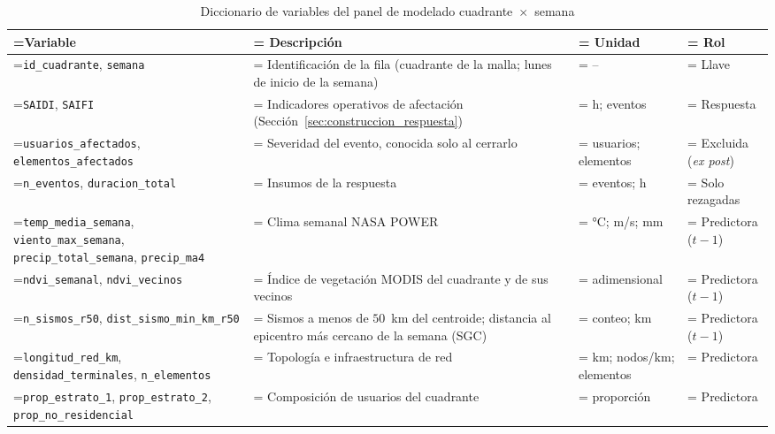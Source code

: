 \begin{table}[!htbp]
\centering\footnotesize
\caption{Diccionario de variables del panel de modelado cuadrante~$\times$~semana}
\label{tab:catalogo_variables}
\begin{tabularx}{\linewidth}{@{} >{\raggedright\arraybackslash\hsize=1.100\hsize\linewidth=\hsize}X >{\raggedright\arraybackslash\hsize=1.450\hsize\linewidth=\hsize}X >{\raggedright\arraybackslash\hsize=0.700\hsize\linewidth=\hsize}X >{\raggedright\arraybackslash\hsize=0.750\hsize\linewidth=\hsize}X @{}}
\toprule
\textbf{Variable} & \textbf{Descripción} & \textbf{Unidad} & \textbf{Rol} \\
\midrule
\texttt{id\_\allowbreak{}cuadrante}, \texttt{semana} & Identificación de la fila (cuadrante de la malla; lunes de inicio de la semana) & -- & Llave \\
\texttt{SAIDI}, \texttt{SAIFI} & Indicadores operativos de afectación (Sección~\ref{sec:construccion_respuesta}) & h; eventos & Respuesta \\
\texttt{usuarios\_\allowbreak{}afectados}, \texttt{elementos\_\allowbreak{}afectados} & Severidad del evento, conocida solo al cerrarlo & usuarios; elementos & Excluida (\emph{ex post}) \\
\texttt{n\_\allowbreak{}eventos}, \texttt{duracion\_\allowbreak{}total} & Insumos de la respuesta & eventos; h & Solo rezagadas \\
\texttt{temp\_\allowbreak{}media\_\allowbreak{}semana}, \texttt{viento\_\allowbreak{}max\_\allowbreak{}semana}, \texttt{precip\_\allowbreak{}total\_\allowbreak{}semana}, \texttt{precip\_\allowbreak{}ma4} & Clima semanal NASA POWER & °C; m/s; mm & Predictora ($t-1$) \\
\texttt{ndvi\_\allowbreak{}semanal}, \texttt{ndvi\_\allowbreak{}vecinos} & Índice de vegetación MODIS del cuadrante y de sus vecinos & adimensional & Predictora ($t-1$) \\
\texttt{n\_\allowbreak{}sismos\_\allowbreak{}r50}, \texttt{dist\_\allowbreak{}sismo\_\allowbreak{}min\_\allowbreak{}km\_\allowbreak{}r50} & Sismos a menos de $50$~km del centroide; distancia al epicentro más cercano de la semana (SGC) & conteo; km & Predictora ($t-1$) \\
\texttt{longitud\_\allowbreak{}red\_\allowbreak{}km}, \texttt{densidad\_\allowbreak{}terminales}, \texttt{n\_\allowbreak{}elementos} & Topología e infraestructura de red & km; nodos/km; elementos & Predictora \\
\texttt{prop\_\allowbreak{}estrato\_\allowbreak{}1}, \texttt{prop\_\allowbreak{}estrato\_\allowbreak{}2}, \texttt{prop\_\allowbreak{}no\_\allowbreak{}residencial} & Composición de usuarios del cuadrante & proporción & Predictora \\

\end{tabularx}
\end{table}
